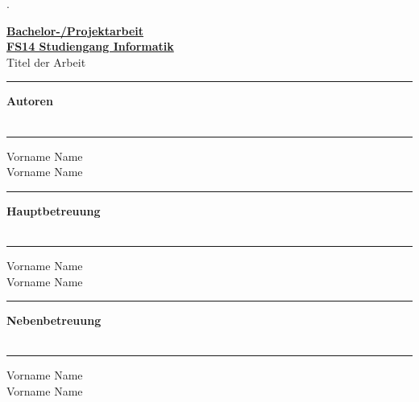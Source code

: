 \begin{titlepage}


\begin{minipage}[b]{0.117\textwidth}
\hskip 0.05cm
\end{minipage}
\begin{minipage}[b]{0.91\textwidth}
\begin{tiny}.\end{tiny}\vskip 2.8cm
	{\huge
	
	\textbf{\underline{Bachelor-/Projektarbeit}}\\
	\textbf{\underline{FS14 Studiengang Informatik}}\\
	
	Titel der Arbeit
	\vskip 0.5cm}
	
	\begin{minipage}[b]{0.27\textwidth}
	\hrule\vskip 0.5cm
		\textbf{Autoren}\\
		\\
	\end{minipage}
	\begin{minipage}[b]{0.03\textwidth}
	\hskip 0.5cm
	\end{minipage}
	\begin{minipage}[b]{0.7\textwidth}
	\hrule\vskip 0.5cm
		Vorname Name\\
		Vorname Name\\
	\end{minipage}
	
	\begin{minipage}[b]{0.27\textwidth}
	\hrule\vskip 0.5cm
		\textbf{Hauptbetreuung}\\
		\\
	\end{minipage}
	\begin{minipage}[b]{0.03\textwidth}
	\hskip 0.5cm
	\end{minipage}
	\begin{minipage}[b]{0.7\textwidth}
	\hrule\vskip 0.5cm
		Vorname Name\\
		Vorname Name\\
	\end{minipage}
	
	\begin{minipage}[b]{0.27\textwidth}
	\hrule\vskip 0.5cm
		\textbf{Nebenbetreuung}\\
		\\
	\end{minipage}
	\begin{minipage}[b]{0.03\textwidth}
	\hskip 0.5cm
	\end{minipage}
	\begin{minipage}[b]{0.7\textwidth}
	\hrule\vskip 0.5cm
		Vorname Name\\
		Vorname Name\\
	\end{minipage}
	

\end{minipage}
\end{titlepage}
